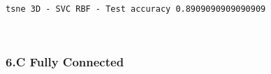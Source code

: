 \documentclass[11pt]{article}
\begin{document}
    \begin{Verbatim}[commandchars=\\\{\}]
tsne 3D - SVC RBF - Test accuracy 0.8909090909090909

    \end{Verbatim}

    \begin{center}
    \end{center}
    { \hspace*{\fill} \\}
    
    \hypertarget{c-fully-connected}{%
\subsubsection{6.C Fully Connected}\label{c-fully-connected}}
\end{document}
